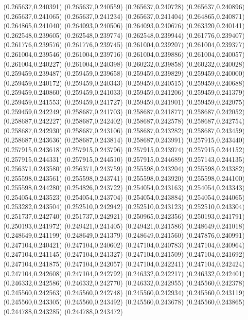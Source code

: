 (0.265637,0.240391)
(0.265637,0.240559)
(0.265637,0.240728)
(0.265637,0.240896)
(0.265637,0.241065)
(0.265637,0.241234)
(0.265637,0.241404)
(0.264865,0.240871)
(0.264865,0.241040)
(0.264093,0.240506)
(0.264093,0.240676)
(0.263320,0.240141)
(0.262548,0.239605)
(0.262548,0.239774)
(0.262548,0.239944)
(0.261776,0.239407)
(0.261776,0.239576)
(0.261776,0.239745)
(0.261004,0.239207)
(0.261004,0.239377)
(0.261004,0.239546)
(0.261004,0.239716)
(0.261004,0.239886)
(0.261004,0.240057)
(0.261004,0.240227)
(0.261004,0.240398)
(0.260232,0.239858)
(0.260232,0.240028)
(0.259459,0.239487)
(0.259459,0.239658)
(0.259459,0.239829)
(0.259459,0.240000)
(0.259459,0.240172)
(0.259459,0.240343)
(0.259459,0.240515)
(0.259459,0.240688)
(0.259459,0.240860)
(0.259459,0.241033)
(0.259459,0.241206)
(0.259459,0.241379)
(0.259459,0.241553)
(0.259459,0.241727)
(0.259459,0.241901)
(0.259459,0.242075)
(0.259459,0.242249)
(0.258687,0.241703)
(0.258687,0.241877)
(0.258687,0.242052)
(0.258687,0.242227)
(0.258687,0.242402)
(0.258687,0.242578)
(0.258687,0.242754)
(0.258687,0.242930)
(0.258687,0.243106)
(0.258687,0.243282)
(0.258687,0.243459)
(0.258687,0.243636)
(0.258687,0.243814)
(0.258687,0.243991)
(0.257915,0.243440)
(0.257915,0.243618)
(0.257915,0.243796)
(0.257915,0.243974)
(0.257915,0.244152)
(0.257915,0.244331)
(0.257915,0.244510)
(0.257915,0.244689)
(0.257143,0.244135)
(0.256371,0.243580)
(0.256371,0.243759)
(0.255598,0.243204)
(0.255598,0.243382)
(0.255598,0.243561)
(0.255598,0.243741)
(0.255598,0.243920)
(0.255598,0.244100)
(0.255598,0.244280)
(0.254826,0.243722)
(0.254054,0.243163)
(0.254054,0.243343)
(0.254054,0.243523)
(0.254054,0.243704)
(0.254054,0.243884)
(0.254054,0.244065)
(0.253282,0.243504)
(0.252510,0.242942)
(0.252510,0.243123)
(0.252510,0.243304)
(0.251737,0.242740)
(0.251737,0.242921)
(0.250965,0.242356)
(0.250193,0.241791)
(0.250193,0.241972)
(0.249421,0.241405)
(0.249421,0.241586)
(0.248649,0.241018)
(0.248649,0.241199)
(0.248649,0.241379)
(0.248649,0.241560)
(0.247876,0.240991)
(0.247104,0.240421)
(0.247104,0.240602)
(0.247104,0.240783)
(0.247104,0.240964)
(0.247104,0.241145)
(0.247104,0.241327)
(0.247104,0.241509)
(0.247104,0.241692)
(0.247104,0.241875)
(0.247104,0.242057)
(0.247104,0.242241)
(0.247104,0.242424)
(0.247104,0.242608)
(0.247104,0.242792)
(0.246332,0.242217)
(0.246332,0.242401)
(0.246332,0.242586)
(0.246332,0.242770)
(0.246332,0.242955)
(0.245560,0.242378)
(0.245560,0.242563)
(0.245560,0.242748)
(0.245560,0.242934)
(0.245560,0.243119)
(0.245560,0.243305)
(0.245560,0.243492)
(0.245560,0.243678)
(0.245560,0.243865)
(0.244788,0.243285)
(0.244788,0.243472)
